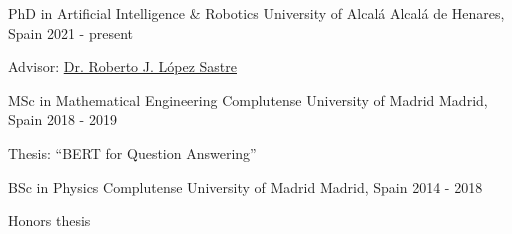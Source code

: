 

\begin{cventries}

  \cventry
    {PhD in Artificial Intelligence \& Robotics} %
    {University of Alcalá} %
    {Alcalá de Henares, Spain} %
    {2021 - present} %
    {
      \begin{cvitems} %
        \item {Advisor: \href{https://gram.web.uah.es/people/rober/}{Dr. Roberto J. López Sastre}}
      \end{cvitems}
    }

  \cventry
    {MSc in Mathematical Engineering} %
    {Complutense University of Madrid} %
    {Madrid, Spain} %
    {2018 - 2019} %
    {
      \begin{cvitems} %
        \item {Thesis: ``BERT for Question Answering''}
      \end{cvitems}
    }

  \cventry
    {BSc in Physics} %
    {Complutense University of Madrid} %
    {Madrid, Spain} %
    {2014 - 2018} %
    {
      \begin{cvitems} %
        \item {Honors thesis}
      \end{cvitems}
    }

\end{cventries}
